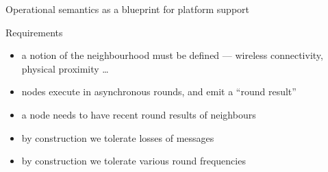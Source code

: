 \documentclass[presentation, 9pt]{beamer}\mode<presentation>{\usetheme{AMSBolognaFC}}
\begin{document}
\begin{frame}{Operational semantics as a blueprint for platform support}
	\begin{exampleblock}{Requirements}
	\begin{itemize}
		\item a notion of the neighbourhood must be defined --- wireless connectivity, physical proximity \dots
		\item nodes execute in asynchronous rounds, and emit a ``round result''
		\item a node needs to have recent round results of neighbours
		\item by construction we tolerate losses of messages
		\item by construction we tolerate various round frequencies
	\end{itemize}
	\end{exampleblock}
\end{frame}
	
\end{document}
